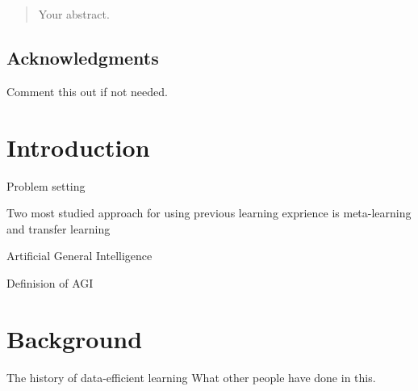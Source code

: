 \documentclass[12pt,twoside]{report}
\date{September 2015}
\begin{document}



\clearpage{\pagestyle{empty}\cleardoublepage}
\setcounter{page}{1}
\pagestyle{fancy}

\begin{abstract}
Your abstract.
\end{abstract}

\cleardoublepage
\section*{Acknowledgments}
Comment this out if not needed.

\clearpage{\pagestyle{empty}\cleardoublepage}

\tableofcontents


\clearpage{\pagestyle{empty}\cleardoublepage}
\setcounter{page}{1}
\fancyhead[LE,RO]{\slshape \rightmark}
\fancyhead[LO,RE]{\slshape \leftmark}

\chapter{Introduction}

Problem setting

Two most studied approach for using previous learning exprience is meta-learning and transfer learning

Artificial General Intelligence

Definision of AGI



\chapter{Background}

The history of data-efficient learning
What other people have done in this.
\end{document}
